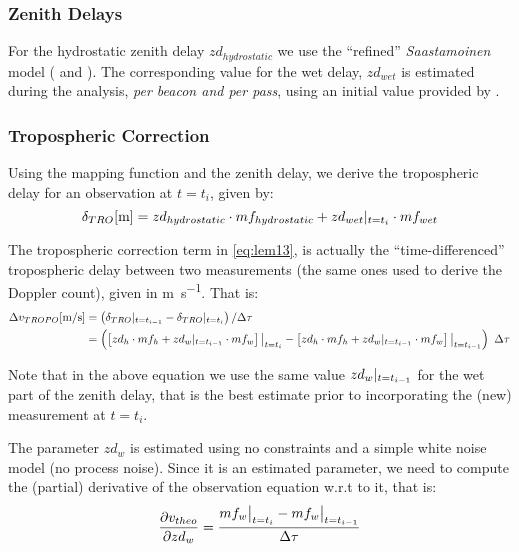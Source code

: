 \subsubsection{Zenith Delays}
For the hydrostatic zenith delay $zd_{hydrostatic}$ we use the ``refined'' 
\emph{Saastamoinen} model (\cite{Davisetal85} and \cite{Saastamoinen72}). 
The corresponding value for the wet delay, $zd_{wet}$ is estimated during the 
analysis, \emph{per beacon and per pass}, using an initial value provided by 
\cite{Askneetal87}.

\subsubsection{Tropospheric Correction}
Using the mapping function and the zenith delay, we derive the tropospheric 
delay for an observation at $t=t_i$, given by:
\begin{equation}
  \delta _{TRO} [\si{\m}] = zd_{hydrostatic} \cdot mf_{hydrostatic} + zd_{wet}\at{t=t_i} \cdot mf_{wet}
  \label{eq:tropo-delay}
\end{equation}

The tropospheric correction term in \ref{eq:lem13}, is actually the ``time-differenced'' 
tropospheric delay between two measurements (the same ones used to derive the 
Doppler count), given in \si{\m \per \s}. That is:
\begin{equation}
  \begin{aligned}
    \Delta v_{TROPO} [\si{\m \per \s}] 
      &= \left( \delta _{TRO} \at{t=t_{i-1}} - \delta _{TRO} \at{t=t_{i}} \right) / \Delta \tau\\
      &= \left( \left[ zd_{h} \cdot mf_{h} + zd_{w}\at{t=t_{i-1}} \cdot mf_{w} \right]\at[\big]{t=t_i} - 
        \left[ zd_{h} \cdot mf_{h} + zd_{w}\at{t=t_{i-1}} \cdot mf_{w} \right]\at[\big]{t=t_{i-1}} \right) \ \Delta \tau
    \label{eq:dtrop-diff}
  \end{aligned}
\end{equation}

Note that in the above equation we use the same value $zd_{w}|_{t=t_{i-1}}$ 
for the wet part of the zenith delay, that is the best estimate prior to 
incorporating the (new) measurement at $t=t_i$.

The parameter $zd_{w}$ is estimated using no constraints and a simple white 
noise model (no process noise). Since it is an estimated parameter, we need 
to compute the (partial) derivative of the observation equation w.r.t to it, 
that is:
\begin{equation}
  \frac{\partial v_{theo}}{\partial zd_{w}} = \frac{mf_{w}\at[\big]{t=t_i} 
    - mf_{w}\at[\big]{t=t_{i-1}}}{\Delta \tau}
  \label{eq:partials-zwd}
\end{equation}
\fi
